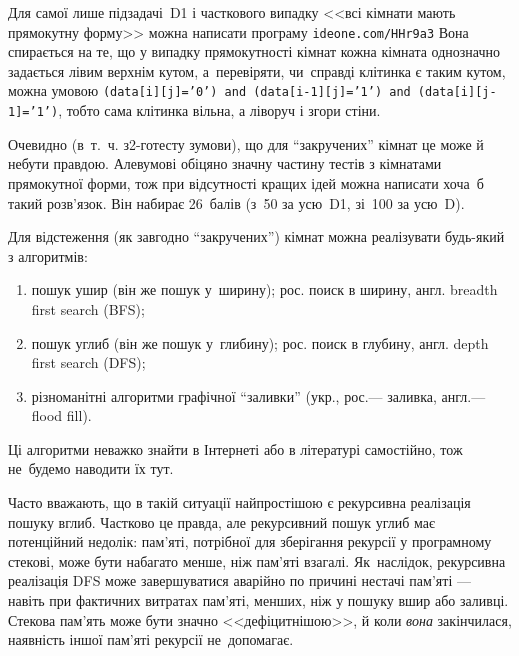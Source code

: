 \Tutorial	%
Для самої лише підзадачі~D1 і часткового випадку <<всі кімнати мають прямокутну форму>> можна написати програму \verb"ideone.com/HHr9a3"\hspace{0.5em plus 1em}
Вона спирається на те, що у випадку прямокутності кімнат кожна кімната однозначно задається лівим верхнім кутом, а~перевіряти, чи~справді клітинка є таким кутом, можна умовою \texttt{\mbox{(data[i][j]='0')} \mbox{and} \mbox{(data[i-1][j]='1')} \mbox{and} \mbox{(data[i][j-1]='1')}}, тобто сама клітинка вільна, а ліворуч і згори стіни.

Очевидно (в~т.~ч. з\nolinebreak[3] \mbox{2-го}\nolinebreak[3] тесту з\nolinebreak[3] умови), що для ``закручених'' кімнат це може й не\nolinebreak[3] бути правдою. Але\nolinebreak[2] в\nolinebreak[3] умові обіцяно значну частину тестів з кімнатами прямокутної форми, тож при відсутності кращих ідей можна написати хоча~б такий розв’язок. Він набирає 26~балів (з~50 за усю~D1, зі~100 за усю~D).



Для відстеження (як завгодно ``закручених'') кімнат можна реалізувати будь-який з алгоритмів:

\begin{enumerate}

\item	
пошук ушир (він же пошук у~ширину); рос. поиск в ширину, англ. breadth first search (BFS);

\item
пошук углиб (він же пошук у~глибину); рос. поиск в глубину, англ. depth first search (DFS);

\item
різноманітні алгоритми графічної ``заливки'' (укр., рос.\nolinebreak[3] --- заливка, англ.\nolinebreak[3] --- flood fill).

\end{enumerate}

Ці алгоритми неважко знайти в Інтернеті або в літературі самостійно, тож не~будемо наводити їх тут.

\myhrulefill

Часто вважають, що в такій ситуації найпростішою є рекурсивна реалізація пошуку вглиб. Частково це правда, але рекурсивний пошук углиб має потенційний недолік: пам'яті, потрібної для зберігання рекурсії у програмному стекові, може бути набагато менше, ніж пам'яті взагалі. Як~наслідок, рекурсивна реалізація DFS може завершуватися аварійно по причині \mbox{нестачі} пам'яті --- навіть при фактичних витратах пам'яті, менших, ніж у пошуку вшир або заливці. Стекова пам'ять може бути значно <<дефіцитнішою>>, й коли \emph{вона} закінчилася, наявність іншої пам'яті рекурсії не~допомагає.

